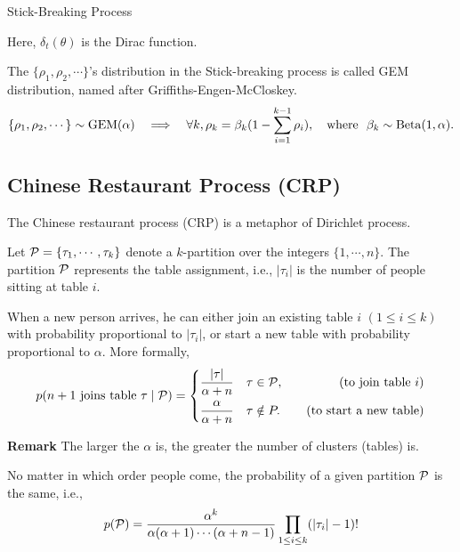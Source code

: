 \begin{algorithm}[H]
 \caption{Stick-Breaking Process}
\SetAlgoLined
 
\end{algorithm}

Here, $\delta_t(\theta)$ is the Dirac function.

\begin{definition}
	The $\{\rho_1, \rho_2, \cdots\}$'s distribution in the Stick-breaking process is called GEM distribution, named after Griffiths-Engen-McCloskey.
	$$
	\{\rho_1, \rho_2, \cdots\} \sim \mathrm{GEM}(\alpha)\quad \Longrightarrow \quad \forall k, \rho_k = \beta_k (1 - \sum_{i=1}^{k-1}\rho_i), \quad \text{where}\ \  \beta_k \sim \mathrm{Beta}(1, \alpha).
	$$
\end{definition}

\subsection{Chinese Restaurant Process (CRP)}
The Chinese restaurant process (CRP) is a metaphor of Dirichlet process.
\begin{definition}[CRP]
Let $\mathcal{P} = \{\tau_1, \cdots, \tau_k \}$ denote a $k$-partition over the integers $\{1, \cdots, n\} $. The partition $\mathcal{P}$ represents the table assignment, i.e., $|\tau_i|$ is the number of people sitting at table $i$.

	When a new person arrives, he can either join an existing table $i$ $(1 \leq i \leq k)$ with probability proportional to $|\tau_i|$, or start a new table with probability proportional to $\alpha$.
	More formally,
$$
p(n + 1 \text{ joins table } \tau \mid \mathcal{P}) = \left\{ \begin{aligned}
	\frac{|\tau|}{\alpha + n} & \quad \tau \in \mathcal{P}, &\quad (\text{to join table } i )\\
	\frac{\alpha}{\alpha + n} & \quad \tau \notin P. &\quad (\text{to start a new table})
\end{aligned}\right.
$$
\end{definition}
\textbf{Remark} The larger the $\alpha$ is, the greater the number of clusters (tables) is.

\begin{property}
	No matter in which order people come, the probability of a given partition $\mathcal{P}$ is the same, i.e.,  
	\begin{equation}
		p(\mathcal{P}) = \frac{\alpha^k}{\alpha (\alpha+1)\cdots (\alpha + n - 1)} \prod_{1 \leq i \leq k} (|\tau_i| - 1)!
	\end{equation}
\end{property}

